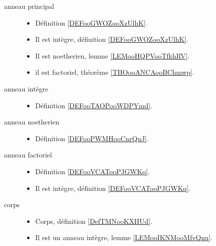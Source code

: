 \begin{description}
	\item[anneau principal]\hspace{1cm}
	\begin{itemize}
		\item
		      Définition \ref{DEFooGWOZooXzUlhK}.
		\item
		      Il est intègre, définition \ref{DEFooGWOZooXzUlhK}.
		\item
		      Il est noetherien, lemme \ref{LEMooHQPVooTfkhRV}.
		\item
		      il est factoriel, théorème \ref{THOooANCAooBChmwp}.
	\end{itemize}
	\item[anneau intègre]\hspace{1cm}
	\begin{itemize}
		\item
		      Définition \ref{DEFooTAOPooWDPYmd}.
	\end{itemize}
	\item[anneau noetherien]\hspace{1cm}
	\begin{itemize}
		\item
		      Définition \ref{DEFooPWMHooCnrQuJ}.
	\end{itemize}
	\item[anneau factoriel]\hspace{1cm}
	\begin{itemize}
		\item
		      Définition \ref{DEFooVCATooPJGWKq}.
		\item
		      Il est intègre, définition \ref{DEFooVCATooPJGWKq}.
	\end{itemize}
	\item[corps]\hspace{1cm}
	\begin{itemize}
		\item
		      Corps, définition \ref{DefTMNooKXHUd}.
		\item
		      Il est un anneau intègre, lemme \ref{LEMooIKNMooMfvQnu}.
	\end{itemize}
\end{description}

